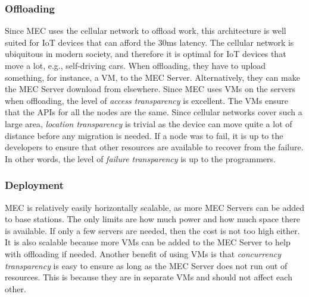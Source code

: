 \subsubsection{Offloading}
Since MEC uses the cellular network to offload work, this architecture is well suited for IoT devices that can afford the 30ms latency. The cellular network is ubiquitous in modern society, and therefore it is optimal for IoT devices that move a lot, e.g., self-driving cars. When offloading, they have to upload something, for instance, a VM, to the MEC Server. Alternatively, they can make the MEC Server download from elsewhere. Since MEC uses VMs on the servers when offloading, the level of \textit{access transparency} is excellent. The VMs ensure that the APIs for all the nodes are the same. Since cellular networks cover such a large area, \textit{location transparency} is trivial as the device can move quite a lot of distance before any migration is needed. If a node was to fail, it is up to the developers to ensure that other resources are available to recover from the failure. In other words, the level of \textit{failure transparency} is up to the programmers.

\subsubsection{Deployment}
MEC is relatively easily horizontally scalable, as more MEC Servers can be added to base stations. The only limits are how much power and how much space there is available. If only a few servers are needed, then the cost is not too high either. It is also scalable because more VMs can be added to the MEC Server to help with offloading if needed. Another benefit of using VMs is that \textit{concurrency transparency} is easy to ensure as long as the MEC Server does not run out of resources. This is because they are in separate VMs and should not affect each other.








